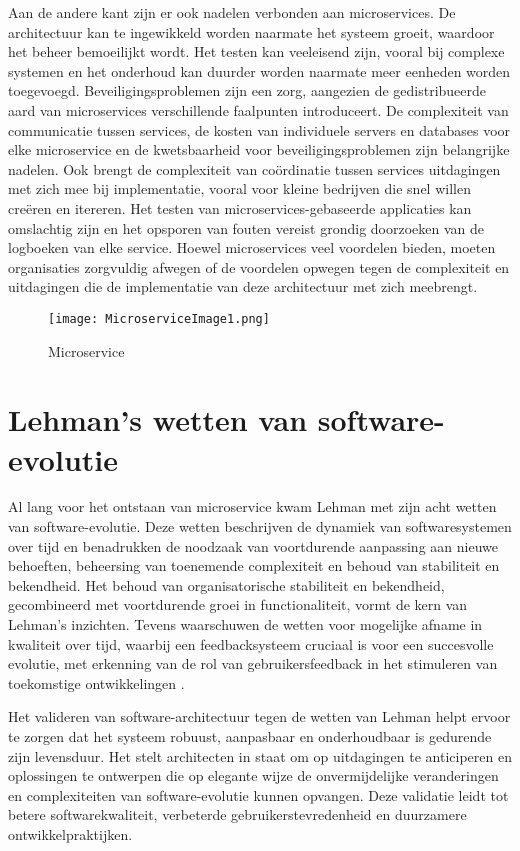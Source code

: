 Aan de andere kant zijn er ook nadelen verbonden aan microservices. De architectuur kan te ingewikkeld worden naarmate het systeem groeit, waardoor het beheer bemoeilijkt wordt. Het testen kan veeleisend zijn, vooral bij complexe systemen en het onderhoud kan duurder worden naarmate meer eenheden worden toegevoegd. Beveiligingsproblemen zijn een zorg, aangezien de gedistribueerde aard van microservices verschillende faalpunten introduceert. 
De complexiteit van communicatie tussen services, de kosten van individuele servers en databases voor elke microservice en de kwetsbaarheid voor beveiligingsproblemen zijn belangrijke nadelen. Ook brengt de complexiteit van coördinatie tussen services uitdagingen met zich mee bij implementatie, vooral voor kleine bedrijven die snel willen creëren en itereren. Het testen van microservices-gebaseerde applicaties kan omslachtig zijn en het opsporen van fouten vereist grondig doorzoeken van de logboeken van elke service. 
Hoewel microservices veel voordelen bieden, moeten organisaties zorgvuldig afwegen of de voordelen opwegen tegen de complexiteit en uitdagingen die de implementatie van deze architectuur met zich meebrengt.

\begin{figure}[H]
	\centering	
	\texttt{[image: MicroserviceImage1.png]} 
	\caption{Microservice} 
	\label{fig:MicroserviceBP} 
\end{figure}
\FloatBarrier

\section{Lehman's wetten van software-evolutie}
Al lang voor het ontstaan van microservice kwam Lehman met zijn acht wetten van software-evolutie. Deze wetten beschrijven de dynamiek van softwaresystemen over tijd en benadrukken de noodzaak van voortdurende aanpassing aan nieuwe behoeften, beheersing van toenemende complexiteit en behoud van stabiliteit en bekendheid. Het behoud van organisatorische stabiliteit en bekendheid, gecombineerd met voortdurende groei in functionaliteit, vormt de kern van Lehman's inzichten. Tevens waarschuwen de wetten voor mogelijke afname in kwaliteit over tijd, waarbij een feedbacksysteem cruciaal is voor een succesvolle evolutie, met erkenning van de rol van gebruikersfeedback in het stimuleren van toekomstige ontwikkelingen \autocite{Richardson}.

Het valideren van software-architectuur tegen de wetten van Lehman helpt ervoor te zorgen dat het systeem robuust, aanpasbaar en onderhoudbaar is gedurende zijn levensduur. Het stelt architecten in staat om op uitdagingen te anticiperen en oplossingen te ontwerpen die op elegante wijze de onvermijdelijke veranderingen en complexiteiten van software-evolutie kunnen opvangen. Deze validatie leidt tot betere softwarekwaliteit, verbeterde gebruikerstevredenheid en duurzamere ontwikkelpraktijken.


